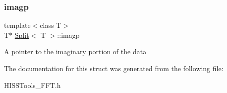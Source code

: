 \subsubsection{\texorpdfstring{imagp}{imagp}}
{\footnotesize\ttfamily template$<$class T$>$ \\
T$\ast$ \hyperlink{struct_split}{Split}$<$ T $>$\+::imagp}

A pointer to the imaginary portion of the data 

The documentation for this struct was generated from the following file\+:\begin{DoxyCompactItemize}
\item 
H\+I\+S\+S\+Tools\+\_\+\+F\+F\+T.\+h\end{DoxyCompactItemize}
